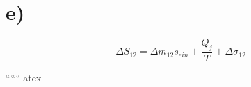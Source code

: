 

\section*{e)}

\[
\Delta S_{12} = \Delta m_{12} s_{ein} + \frac{Q_{j}}{T} + \Delta \sigma_{12}
\]

``````latex